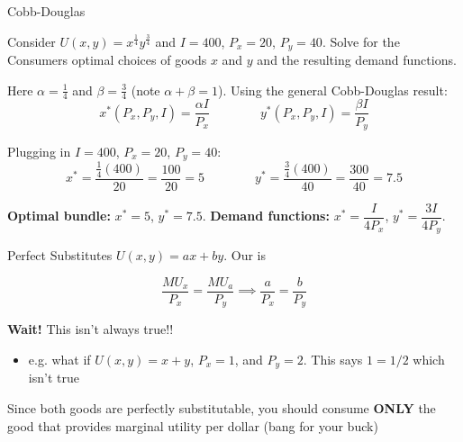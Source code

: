 \documentclass{beamer}
\begin{document}
\begin{frame}{Cobb-Douglas}
  
  \bigskip
  Consider $U(x,y) = x^{\frac{1}{4}}y^{\frac{3}{4}}$ and $I=400$, $P_{x} = 20$, $P_{y}=40$. Solve for the Consumers optimal choices of goods $x$ and $y$ and the resulting demand functions.
\end{frame}

\begin{frame}

  \bigskip
  Here $\alpha = \frac{1}{4}$ and $\beta = \frac{3}{4}$ (note $\alpha + \beta = 1$). Using the general Cobb-Douglas result:
  $$
    x^*(P_x,P_y,I) = \frac{\alpha I}{P_x} \qquad\qquad y^*(P_x,P_y,I) = \frac{\beta I}{P_y}
  $$

  \bigskip
  Plugging in $I=400$, $P_x=20$, $P_y=40$:
  $$
    x^* = \frac{\frac{1}{4}(400)}{20} = \frac{100}{20} = 5
    \qquad\qquad
    y^* = \frac{\frac{3}{4}(400)}{40} = \frac{300}{40} = 7.5
  $$

  \bigskip
  \textbf{Optimal bundle:} $x^* = 5$, $y^* = 7.5$. \quad
  \textbf{Demand functions:} $x^* = \dfrac{I}{4P_x}$, \quad $y^* = \dfrac{3I}{4P_y}$.
\end{frame}

\begin{frame}{Perfect Substitutes}
  $U(x,y) = ax + by$. Our  is

  $$
    \frac{MU_x}{P_x} = \frac{MU_a}{P_y} \implies \frac{a}{P_x} = \frac{b}{P_y}
  $$

  \bigskip
  \textbf{Wait!} This isn't always true!!
  \begin{itemize}
    \item e.g. what if $U(x,y) = x + y$, $P_x = 1$, and $P_y = 2$. This says $1 = 1/2$ which isn't true
  \end{itemize} 

  \bigskip
  Since both goods are perfectly substitutable, you should consume \textbf{ONLY} the good that provides marginal utility per dollar (bang for your buck)
\end{frame}
\end{document}
